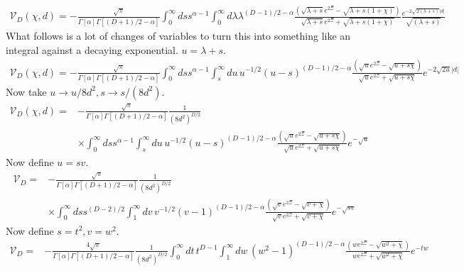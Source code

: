 \begin{align}
\mathcal{V}_D(\chi,d)=-\frac{\sqrt{\pi}}{\Gamma[\alpha]\Gamma\left[(D+1)/2-\alpha\right]}
\int_0^\infty ds s^{\alpha-1}\int_0^\infty d\lambda \lambda^{(D-1)/2-\alpha}
\frac{\left(\sqrt{\lambda+s}e^{2\Xi }- \sqrt{\lambda +s(1 +\chi)}\right) }
{\sqrt{\lambda +s} e^{2 \Xi }+\sqrt{\lambda +s(1+\chi)}}\frac{e^{-2\sqrt{2(\lambda+s) } |d|}}{\sqrt{(\lambda+s)}}
\end{align}
What follows is a lot of changes of variables to turn this into something like an integral against a decaying exponential.  
$u=\lambda+s$.  
\begin{align}
\mathcal{V}_D(\chi,d)=-\frac{\sqrt{\pi}}{\Gamma[\alpha]\Gamma\left[(D+1)/2-\alpha\right]}
\int_0^\infty ds s^{\alpha-1}\int_s^\infty du\, u^{-1/2}(u-s)^{(D-1)/2-\alpha}
\frac{\left(\sqrt{u}e^{2\Xi }- \sqrt{u + s\chi}\right) }{\sqrt{u} e^{2 \Xi }+\sqrt{u + s\chi}}e^{-2\sqrt{2u } |d|}
\end{align}
Now take $u\rightarrow u/8d^2, s\rightarrow s/(8d^2)$.  
\begin{align}
\mathcal{V}_D(\chi,d)%
=&-\frac{\sqrt{\pi}}{\Gamma[\alpha]\Gamma\left[(D+1)/2-\alpha\right]}\frac{1}{(8d^2)^{D/2}}\nonumber\\
& \times\int_0^\infty ds s^{\alpha-1}\int_s^\infty du\, u^{-1/2} (u-s)^{(D-1)/2-\alpha}
\frac{\left(\sqrt{u}e^{2\Xi }- \sqrt{u + s\chi}\right) }{\sqrt{u} e^{2 \Xi }+\sqrt{u + s\chi}}e^{-\sqrt{u }}
\end{align}
Now define $u = sv$.  
\begin{align}
\mathcal{V}_D=&-\frac{\sqrt{\pi}}{\Gamma[\alpha]\Gamma\left[(D+1)/2-\alpha\right]}\frac{1}{(8d^2)^{D/2}}\nonumber\\
& \times\int_0^\infty ds s^{(D-2)/2}\int_1^\infty dv \, v^{-1/2}(v-1)^{(D-1)/2-\alpha}
\frac{\left(\sqrt{v}e^{2\Xi }- \sqrt{v + \chi}\right) }{\sqrt{v} e^{2 \Xi }+\sqrt{v + \chi}}e^{-\sqrt{s v}}
\end{align}
Now define $ s = t^2, v = w^2$.  
\begin{align}
\mathcal{V}_D%
=&-\frac{4\sqrt{\pi}}{\Gamma[\alpha]\Gamma\left[(D+1)/2-\alpha\right]}\frac{1}{(8d^2)^{D/2}}
\int_0^\infty dt\, t^{D-1}\int_1^\infty dw\,(w^2-1)^{(D-1)/2-\alpha}
\frac{\left(w e^{2\Xi }- \sqrt{w^2 + \chi}\right) }{w e^{2 \Xi }+\sqrt{w^2 + \chi}}e^{-tw}
\end{align}
